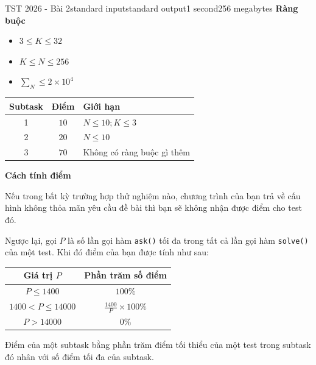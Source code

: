 \begin{problem}{TST 2026 - Bài 2}{standard input}{standard output}{1 second}{256 megabytes}
\textbf{Ràng buộc}

\begin{itemize}
   \item $3\le K\le 32$
   \item $K\le N\le 256$
   \item $\sum_N\le 2\times 10^4$
\end{itemize}

\Scoring
\begin{center}
  \begin{tabular}{|c|c|l|} \hline
    \textbf{Subtask} & \textbf{Điểm} & \textbf{Giới hạn} \\ \hline
    1 & $10$ & $N\le 10;K\le 3$ \\ \hline
    2 & $20$ & $N\le 10$ \\ \hline
    3 & $70$ & Không có ràng buộc gì thêm \\ \hline
  \end{tabular}
\end{center}

\textbf{Cách tính điểm}

Nếu trong bất kỳ trường hợp thử nghiệm nào, chương trình của bạn trả về cấu hình không thỏa mãn yêu cầu đề bài thì bạn sẽ không nhận được điểm cho test đó.

Ngược lại, gọi $P$ là số lần gọi hàm \texttt{ask()} tối đa trong tất cả lần gọi hàm \texttt{solve()} của một test. Khi đó điểm của bạn được tính như sau:

\begin{center}
  \begin{tabular}{|c|c|} \hline
    \textbf{Giá trị $P$} & \textbf{Phần trăm số điểm} \\ \hline
    $P \le 1400$ & $100\%$ \\ \hline
    $1400 \lt P \le 14000$ & $\frac{1400}P\times 100\%$ \\ \hline
    $P \gt 14000$ & $0\%$ \\ \hline
  \end{tabular}
\end{center}

Điểm của một subtask bằng phần trăm điểm tối thiểu của một test trong subtask đó nhân với số điểm tối đa của subtask.


\end{problem}

